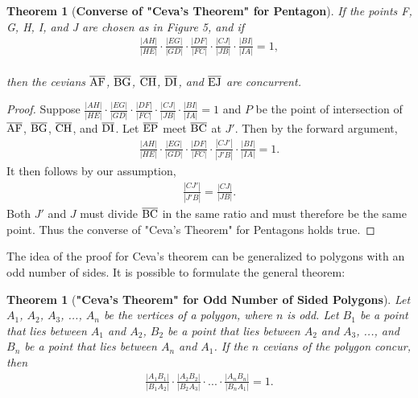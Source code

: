 \documentclass[12pt,a4paper,reqno,parskip=full]{amsart}
\numberwithin{equation}{section}
\theoremstyle{plain}
\newtheorem{theorem}[subsection]{Theorem}
\theoremstyle{definition}
\begin{document}
\begin{theorem} [\textbf{Converse of "Ceva's Theorem" for Pentagon}]
If the points F, G, H, I, and J are chosen as in Figure 5, and if
\begin{align*}
\frac{|AH|}{|HE|}\cdot\frac{|EG|}{|GD|}\cdot\frac{|DF|}{|FC|}\cdot\frac{|CJ|}{|JB|}\cdot\frac{|BI|}{|IA|} = 1,
\end{align*}
\\
then the cevians $\overline{\rm AF}$, $\overline{\rm BG}$, $\overline{\rm CH}$, $\overline{\rm DI}$, and $\overline{\rm EJ}$ are concurrent.
\end{theorem}
\begin{proof}
Suppose $\frac{|AH|}{|HE|}\cdot\frac{|EG|}{|GD|}\cdot\frac{|DF|}{|FC|}\cdot\frac{|CJ|}{|JB|}\cdot\frac{|BI|}{|IA|} = 1$ and $P$ be the point of intersection of $\overline{\rm AF}$, $\overline{\rm BG}$, $\overline{\rm CH}$, and $\overline{\rm DI}$. Let $\overline{\rm EP}$ meet $\overline{\rm BC}$ at $J'$. Then by the forward argument,
\\
\begin{align*}
\frac{|AH|}{|HE|}\cdot\frac{|EG|}{|GD|}\cdot\frac{|DF|}{|FC|}\cdot\frac{|CJ'|}{|J'B|}\cdot\frac{|BI|}{|IA|} = 1.
\end{align*}
It then follows by our assumption,
\begin{align*}
\frac{|CJ'|}{|J'B|} = \frac{|CJ|}{|JB|}.
\end{align*}
Both $J'$ and $J$ must divide $\overline{\rm BC}$ in the same ratio and must therefore be the same point. Thus the converse of "Ceva's Theorem" for Pentagons holds true.
\end{proof}

The idea of the proof for Ceva's theorem can be generalized to polygons with an odd number of sides. It is possible to formulate the general theorem:
\begin{theorem}[\textbf{"Ceva's Theorem" for Odd Number of Sided Polygons}]
Let $A_1$, $A_2$, $A_3$, ..., $A_n$ be the vertices of a polygon, where $n$ is odd. Let $B_1$ be a point that lies between $A_1$ and $A_2$, $B_2$ be a point that lies between $A_2$ and $A_3$, ..., and $B_n$ be a point that lies between $A_n$ and $A_1$. If the $n$ cevians of the polygon concur, then
\\
\begin{align*}
\frac{|A_1B_1|}{|B_1A_2|}\cdot\frac{|A_2B_2|}{|B_2A_3|}\cdot...\cdot\frac{|A_nB_n|}{|B_nA_1|} = 1.
\end{align*}
\end{theorem}
\end{document}
